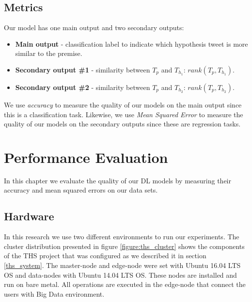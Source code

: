 \documentclass[12pt]{report}
\begin{document}
\section{Metrics}
Our model has one main output and two secondary outputs: 
\begin{itemize}
	\item {\bf Main output}  - classification label to indicate which hypothesis tweet is more similar to the premise. 
	\item {\bf Secondary output \#1} - similarity between $T_p$ and  $T_{h_1}$: $rank(T_p, T_{h_1})$.
	\item {\bf Secondary output \#2} - similarity between $T_p$ and  $T_{h_2}$: $rank(T_p, T_{h_2})$.
\end{itemize} 
We use {\em accuracy} to measure the quality of  our models on the main output  since this is a classification task. Likewise, 
we use  {\em Mean Squared Error} to measure the quality of  our models on the secondary outputs since these are regression tasks. 


\chapter{Performance Evaluation} \label{chapter 5}
In this chapter we evaluate the quality of our \ac{DL} models by measuring their accuracy and mean squared errors on our data sets. 
\section{Hardware} 

In this research we use two different environments to run our experiments. The cluster distribution presented in figure \ref{figure:ths_cluster} shows the components of the \ac{THS} project that was configured as we described it in section \ref{ths_system}. The master-node and edge-node were set with Ubuntu 16.04 LTS \ac{OS} and data-nodes with Ubuntu 14.04 LTS \ac{OS}. These nodes are installed and run on bare metal. All operations are executed in the edge-node that connect the users with Big Data environment.
\end{document}
